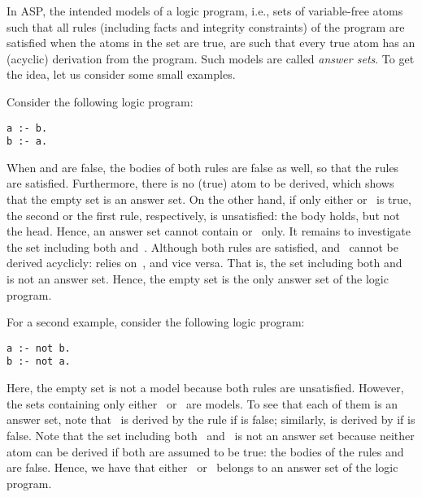 In ASP, the intended models of a logic program, i.e.,
sets of variable-free atoms such that all rules
(including facts and integrity constraints)
of the program are satisfied when the atoms in the set are true, 
are such that every true atom has an (acyclic) derivation from the program.
Such models are called \emph{answer sets}.
To get the idea, let us consider some small examples.

\begin{example}\label{ex:as:one}
Consider the following logic program:
%
\begin{lstlisting}[numbers=none]
a :- b.
b :- a.
\end{lstlisting}
%
When  and  are false, the bodies of both rules are false as well,
so that the rules are satisfied.
Furthermore, there is no (true) atom to be derived,
which shows that the empty set is an answer set. 
On the other hand, if only either  or~ is true,
the second or the first rule, respectively, is unsatisfied:
the body holds, but not the head.
Hence, an answer set cannot contain  or~ only.
It remains to investigate the set including both  and~.
Although both rules are satisfied, %
 and~ cannot be derived acyclicly:
 relies on~, and vice versa.
That is, the set including both  and~ is not an answer set. %
Hence, the empty set is the only answer set of the logic program.
\eexample
\end{example}

\begin{example}\label{ex:as:two}
For a second example, consider the following logic program:
%
\begin{lstlisting}[numbers=none]
a :- not b.
b :- not a.
\end{lstlisting}
%
Here, the empty set is not a model because both rules are unsatisfied.
However, the sets containing only either~ or~ are models.
To see that each of them is an answer set,
note that~ is derived by the rule 
if  is false;
similarly,
 is derived by 
if  is false.
Note that the set including both~ and~ is not an answer set
because neither atom can be derived if both are assumed to be true:
the bodies of the rules
 and
 are false.
Hence, we have that
either~ or~ belongs to
an answer set of the logic program.
\eexample
\end{example}

